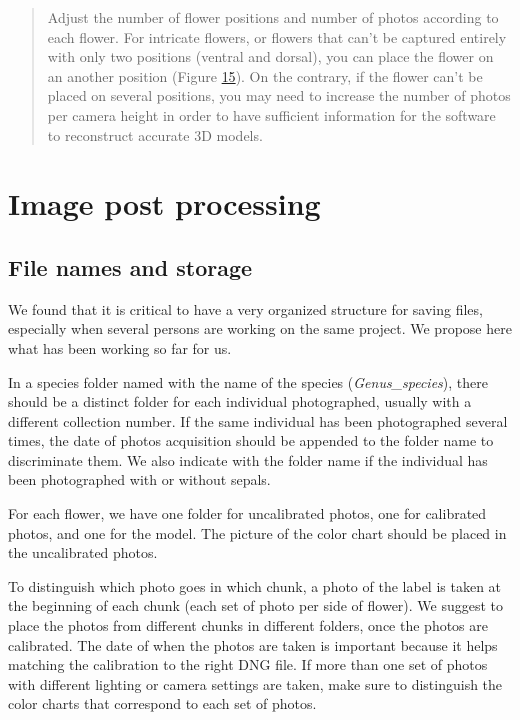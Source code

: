 \documentclass[
]{book}
\begin{document}
\begin{quote}
Adjust the number of flower positions and number of photos according to
each flower. For intricate flowers, or flowers that can't be captured
entirely with only two positions (ventral and dorsal), you can place the
flower on an another position (Figure
\protect\hyperlink{flowerplacement_3}{15}). On the
contrary, if the flower can't be placed on several positions, you may
need to increase the number of photos per camera height in order to have
sufficient information for the software to reconstruct accurate 3D
models.
\end{quote}

\hypertarget{image-post-processing}{%
\chapter{Image post processing}\label{image-post-processing}}

\hypertarget{file-names-and-storage}{%
\section{File names and storage}\label{file-names-and-storage}}

We found that it is critical to have a very organized structure for
saving files, especially when several persons are working on the same
project. We propose here what has been working so far for us.

In a species folder named with the name of the species
(\emph{Genus\_species}), there should be a distinct folder for each individual
photographed, usually with a different collection number. If the same
individual has been photographed several times, the date of photos
acquisition should be appended to the folder name to discriminate them.
We also indicate with the folder name if the individual has been
photographed with or without sepals.

For each flower, we have one folder for uncalibrated photos, one for
calibrated photos, and one for the model. The picture of the color chart
should be placed in the uncalibrated photos.

To distinguish which photo goes in which chunk, a photo of the label is
taken at the beginning of each chunk (each set of photo per side of
flower). We suggest to place the photos from different chunks in
different folders, once the photos are calibrated. The date of when the
photos are taken is important because it helps matching the calibration
to the right DNG file. If more than one set of photos with different
lighting or camera settings are taken, make sure to distinguish the
color charts that correspond to each set of photos.
\end{document}
